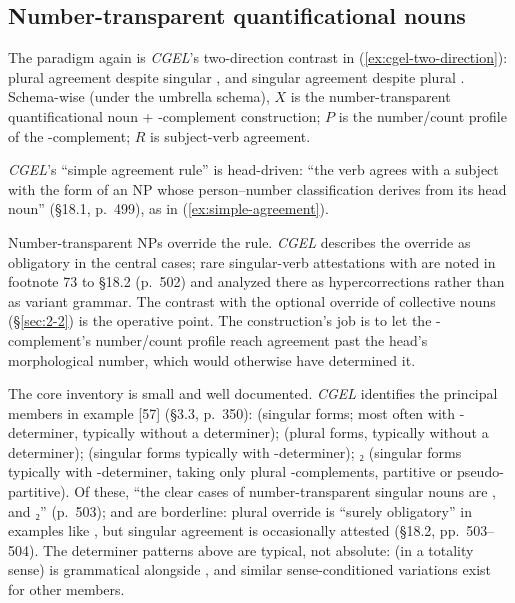 \subsection{Number-transparent quantificational nouns}\label{sec:2-1}

The paradigm again is \textit{CGEL}'s two-direction contrast in (\ref{ex:cgel-two-direction}): plural agreement despite singular , and singular agreement despite plural . Schema-wise (under the umbrella schema), $X$ is the number-transparent quantificational noun + -complement construction; $P$ is the number/count profile of the -complement; $R$ is subject-verb agreement.

\textit{CGEL}'s \enquote{simple agreement rule} is head-driven: \enquote{the verb agrees with a subject with the form of an NP whose person--number classification derives from its head noun} (§18.1, p.~499), as in (\ref{ex:simple-agreement}).

\ea\label{ex:simple-agreement}
\ea {}
\ex {}
\z
\z

Number-transparent NPs override the rule. \textit{CGEL} describes the override as obligatory in the central cases; rare singular-verb attestations with  are noted in footnote 73 to §18.2 (p.~502) and analyzed there as hypercorrections rather than as variant grammar. The contrast with the optional override of collective nouns (§\ref{sec:2-2}) is the operative point. The construction's job is to let the -complement's number/count profile reach agreement past the head's morphological number, which would otherwise have determined it.

The core inventory is small and well documented. \textit{CGEL} identifies the principal members in example [57] (§3.3, p.~350):  (singular forms;  most often with -determiner,  typically without a determiner);  (plural forms, typically without a determiner);  (singular forms typically with -determiner); ₂ (singular forms typically with -determiner, taking only plural -complements, partitive or pseudo-partitive). Of these, \enquote{the clear cases of number-transparent singular nouns are , and ₂} (p.~503);  and  are borderline: plural override is \enquote{surely obligatory} in examples like , but singular agreement is occasionally attested (§18.2, pp.~503--504). The determiner patterns above are typical, not absolute:  (in a totality sense) is grammatical alongside , and similar sense-conditioned variations exist for other members.

